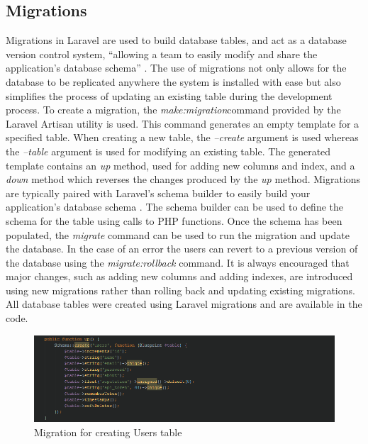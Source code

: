 \subsection{Migrations}
Migrations in Laravel are used to build database tables, and act as a database version control system, ``allowing a team to easily modify and share the application's database schema'' \cite{Laravel:Migrations}. The use of migrations not only allows for the database to be replicated anywhere the system is installed with ease but also simplifies the process of updating an existing table during the development process.  To create a migration, the \emph{make:migration}command provided by the Laravel Artisan utility is used. This command generates an empty template for a specified table. When creating a new table, the \emph{--create} argument is used whereas the \emph{--table} argument is used for modifying an existing table. The generated template contains an \emph{up} method, used for adding new columns and index, and a \emph{down} method which reverses the changes produced by the \emph{up} method. Migrations are typically paired with Laravel's schema builder to easily build your application's database schema \cite{Laravel:Migrations}. The schema builder can be used to define the schema for the table using calls to PHP functions. Once the schema has been populated, the \emph{migrate} command can be used to run the migration and update the database. In the case of an error the users can revert to a previous version of the database using the \emph{migrate:rollback} command. It is always encouraged that major changes, such as adding new columns and adding indexes, are introduced using new migrations rather than rolling back and updating existing migrations. All database tables were created using Laravel migrations and are available in the code.

\begin{figure}[H]
	\centering
	\includegraphics[width=\textwidth]{Images/Implementation/UserMigration}
	\caption{Migration for creating Users table} \label{fig:UserMigration}
\end{figure}

